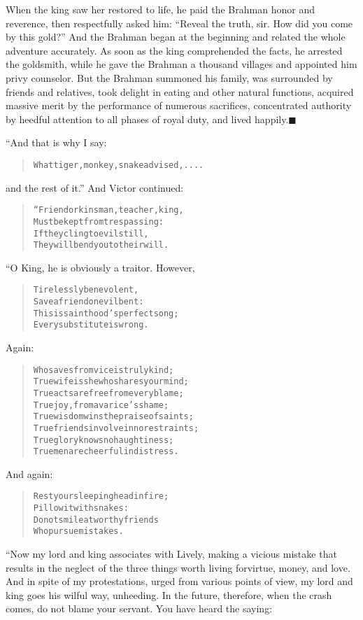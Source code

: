 \documentclass[article, twoside, 14pt]{memoir}
\newcommand{\qed}{\hfill \ensuremath{\blacksquare}}
\renewenvironment{verbatim}{%
\begin{quote}%
\vskip -10pt%
\begin{alltt}\normalfont\large}{\end{alltt}%
\end{quote}%
\vskip -10pt
} %
\begin{document}
When the king saw her restored to life, he paid the Brahman honor
and reverence, then respectfully asked him:
``Reveal the truth, sir. How did you come by this gold?'' And the
Brahman began at the beginning and related the whole adventure
accurately. As soon as the king comprehended the facts, he arrested
the goldsmith, while he gave the Brahman a thousand villages and
appointed him privy counselor. But the Brahman summoned his family,
was surrounded by friends and relatives, took delight in eating and
other natural functions, acquired massive merit by the performance
of numerous sacrifices, concentrated authority by heedful attention
to all phases of royal duty, and lived
happily.\hyperref[s12]{\qed}

“And that is why I say:

\begin{verbatim}
What tiger, monkey, snake advised, ....
\end{verbatim}
and the rest of it.” And Victor continued:

\begin{verbatim}
“Friend or kinsman, teacher, king,
Must be kept from trespassing:
If they cling to evil still,
They will bend you to their will.
\end{verbatim}
“O King, he is obviously a traitor. However,

\begin{verbatim}
Tirelessly benevolent,
Save a friend on evil bent:
This is sainthood's perfect song;
Every substitute is wrong.
\end{verbatim}
Again:

\begin{verbatim}
Who saves from vice is truly kind;
True wife is she who shares your mind;
True acts are free from every blame;
True joy, from avarice's shame;
True wisdom wins the praise of saints;
True friends involve in no restraints;
True glory knows no haughtiness;
True men are cheerful in distress.
\end{verbatim}
And again:

\begin{verbatim}
Rest your sleeping head in fire;
Pillow it with snakes:
Do not smile at worthy friends
Who pursue mistakes.
\end{verbatim}
“Now my lord and king associates with Lively, making a vicious
mistake that results in the neglect of the three things worth
living for{\textemdash}virtue, money, and love. And in spite of my
protestations, urged from various points of view, my lord and king
goes his wilful way, unheeding. In the future, therefore, when the
crash comes, do not blame your servant. You have heard the saying:
\end{document}
